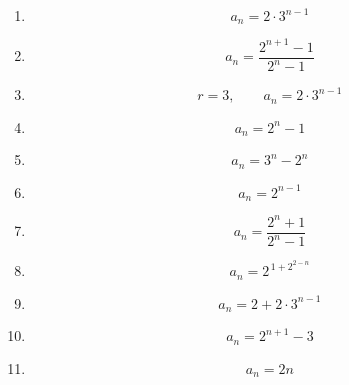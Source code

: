 \begin{enumerate}[label=\textbf{問\arabic*.},leftmargin=3.8em,format=\bookitemlink{practice-basic}{answer}{problem}]
\[            a_n=2^n-2
          \]
        \item \[
            a_n=2\cdot3^{n-1}
          \]
        \item \[
            a_n=\frac{2^{n+1}-1}{2^n-1}
          \]
        \item \[
            r=3,\qquad a_n=2\cdot3^{n-1}
          \]
        \item \[
            a_n=2^n-1
          \]
        \item \[
            a_n=3^n-2^n
          \]
        \item \[
            a_n=2^{n-1}
          \]
        \item \[
            a_n=\frac{2^n+1}{2^n-1}
          \]
        \item \[
            a_n=2^{\,1+2^{2-n}}
          \]
        \item \[
            a_n=2+2\cdot3^{n-1}
          \]
        \item \[
            a_n=2^{n+1}-3
          \]
        \item \[
            a_n=2n
          \]
      \end{enumerate}


